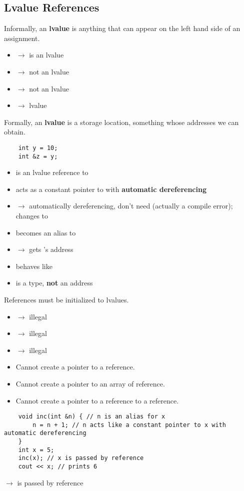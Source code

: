 \subsection{Lvalue References}
Informally, an \textbf{lvalue} is anything that can appear on the left hand side of
an assignment.
\begin{itemize}
      \item {} $ \rightarrow $  is an lvalue
      \item {} $ \rightarrow $ not an lvalue
      \item {} $ \rightarrow $ not an lvalue
      \item {} $ \rightarrow $  lvalue
\end{itemize}
Formally, an \textbf{lvalue} is a storage location, something whose addresses we
can obtain.
\begin{lstlisting}
    int y = 10;
    int &z = y;
\end{lstlisting}
\begin{itemize}
      \item {} is an lvalue reference to 
      \item {} acts as a constant pointer to  with
            \textbf{automatic dereferencing}
      \item {} $ \rightarrow $ automatically dereferencing,
            don't need  (actually a compile error); changes  to 
      \item {} becomes an alias to 
      \item {} $ \rightarrow $ gets 's address
      \item {} behaves like 
      \item {} is a type, \textbf{not} an address
\end{itemize}
References must be initialized to lvalues.
\begin{itemize}
      \item {} $ \rightarrow $ illegal
      \item {} $ \rightarrow $ illegal
      \item {} $ \rightarrow $ illegal
\end{itemize}
\begin{itemize}
      \item Cannot create a pointer to a reference.
      \item Cannot create a pointer to an array of reference.
      \item Cannot create a pointer to a reference to a reference.
\end{itemize}
\begin{lstlisting}
    void inc(int &n) { // n is an alias for x
        n = n + 1; // n acts like a constant pointer to x with automatic dereferencing
    }
    int x = 5;
    inc(x); // x is passed by reference
    cout << x; // prints 6
\end{lstlisting}
 $ \rightarrow $  is passed by reference
